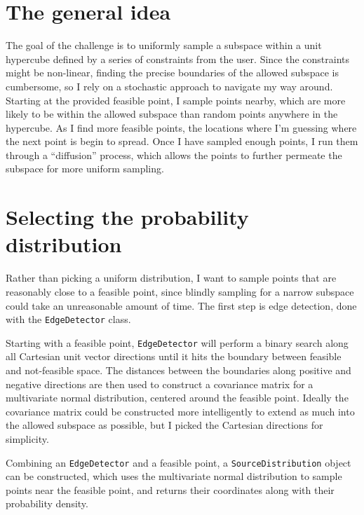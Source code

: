 \documentclass[12pt, fleqn]{article}
\newcommand{\code}[1]{\texttt{#1}}
\begin{document}
\maketitle

\section{The general idea}
The goal of the challenge is to uniformly sample a subspace within a unit hypercube defined by a series of constraints from the user.
Since the constraints might be non-linear, finding the precise boundaries of the allowed subspace is cumbersome, so I rely on a stochastic approach to navigate my way around.
Starting at the provided feasible point, I sample points nearby, which are more likely to be within the allowed subspace than random points anywhere in the hypercube.
As I find more feasible points, the locations where I'm guessing where the next point is begin to spread.
Once I have sampled enough points, I run them through a ``diffusion'' process, which allows the points to further permeate the subspace for more uniform sampling.

\section{Selecting the probability distribution}
Rather than picking a uniform distribution, I want to sample points that are reasonably close to a feasible point, since blindly sampling for a narrow subspace could take an unreasonable amount of time.
The first step is edge detection, done with the \code{EdgeDetector} class.

Starting with a feasible point, \code{EdgeDetector} will perform a binary search along all Cartesian unit vector directions until it hits the boundary between feasible and not-feasible space.
The distances between the boundaries along positive and negative directions are then used to construct a covariance matrix for a multivariate normal distribution, centered around the feasible point.
Ideally the covariance matrix could be constructed more intelligently to extend as much into the allowed subspace as possible, but I picked the Cartesian directions for simplicity.

Combining an \code{EdgeDetector} and a feasible point, a \code{SourceDistribution} object can be constructed, which uses the multivariate normal distribution to sample points near the feasible point, and returns their coordinates along with their probability density.
\end{document}
